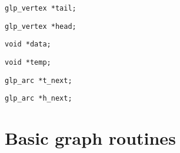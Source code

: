 \medskip

\noindent
\verb|glp_vertex *tail;|

\begin{comment}Pointer to a vertex, which is tail endpoint of the arc.
\end{comment}

\medskip

\noindent
\verb|glp_vertex *head;|

\begin{comment}Pointer to a vertex, which is head endpoint of the arc.
\end{comment}

\medskip

\noindent
\verb|void *data;|

\begin{comment}Pointer to a data block associated with the arc. This
data block is automatically allocated on creating a new arc and freed on
deleting the arc. If $v\_size=0$, the block is not allocated, and this
field contains \verb|NULL|.
\end{comment}

\medskip

\noindent
\verb|void *temp;|

\begin{comment}Working pointer, which may be used freely for any
purposes. The application program can change this field directly.
\end{comment}

\medskip

\noindent
\verb|glp_arc *t_next;|

\begin{comment}Pointer to another arc, which has the same tail endpoint
as this one. \verb|NULL| in this field indicates the end of the list of
outgoing arcs.
\end{comment}

\medskip

\noindent
\verb|glp_arc *h_next;|

\begin{comment}Pointer to another arc, which has the same head endpoint
as this one. \verb|NULL| in this field indicates the end of the list of
incoming arcs.
\end{comment}

\newpage

\section{Basic graph routines}

